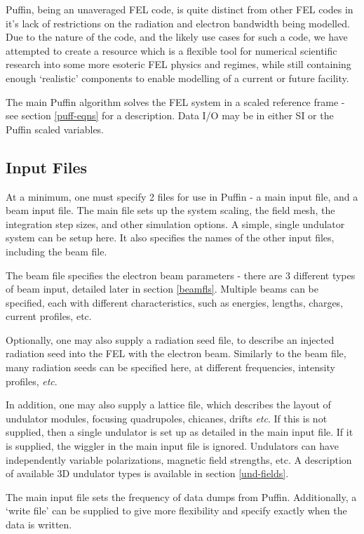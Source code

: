 \documentclass[12pt]{article}%
\begin{document}
Puffin, being an unaveraged FEL code, is quite distinct from other FEL codes in it's lack of restrictions on the radiation and electron bandwidth being modelled. Due to the nature of the code, and the likely use cases for such a code, we have attempted to create a resource which is a flexible tool for numerical scientific research into some more esoteric FEL physics and regimes, while still containing enough `realistic'  components to enable modelling of a current or future facility. 

The main Puffin algorithm solves the FEL system in a scaled reference frame - see section \ref{puff-eqns} for a description. Data I/O may be in either SI or the Puffin scaled variables.

\subsection{Input Files}

At a minimum, one must specify 2 files for use in Puffin - a main input file, and a beam input file. The main file sets up the system scaling, the field mesh, the integration step sizes, and other simulation options. A simple, single undulator system can be setup here. It also specifies the names of the other input files, including the beam file.

The beam file specifies the electron beam parameters - there are 3 different types of beam input, detailed later in section \ref{beamfls}. Multiple beams can be specified, each with different characteristics, such as energies, lengths, charges, current profiles, etc.

Optionally, one may also supply a radiation seed file, to describe an injected radiation seed into the FEL with the electron beam. Similarly to the beam file, many radiation seeds can be specified here, at different frequencies, intensity profiles, \textit{etc}.

In addition, one may also supply a lattice file, which describes the layout of undulator modules, focusing quadrupoles, chicanes, drifts \textit{etc}. If this is not supplied, then a single undulator is set up as detailed in the main input file. If it is supplied, the wiggler in the main input file is ignored. Undulators can have independently variable polarizations, magnetic field strengths, etc. A description of available 3D undulator types is available in section \ref{und-fields}.

The main input file sets the frequency of data dumps from Puffin. Additionally, a `write file' can be supplied to give more flexibility and specify exactly when the data is written.
\end{document}
